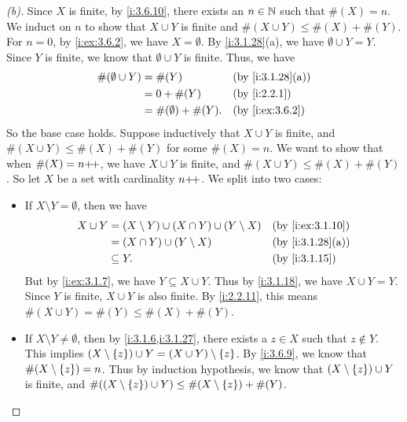\begin{proof}[(b)]
  Since \(X\) is finite, by \cref{i:3.6.10}, there exists an \(n \in \mathbb{N}\) such that \(\#(X) = n\).
  We induct on \(n\) to show that \(X \cup Y\) is finite and \(\#(X \cup Y) \leq \#(X) + \#(Y)\).
  For \(n = 0\), by \cref{i:ex:3.6.2}, we have \(X = \emptyset\).
  By \cref{i:3.1.28}(a), we have \(\emptyset \cup Y = Y\).
  Since \(Y\) is finite, we know that \(\emptyset \cup Y\) is finite.
  Thus, we have
  \begin{align*}
    \#(\emptyset \cup Y) & = \#(Y)                  &  & \by{i:3.1.28}[a] \\
                         & = 0 + \#(Y)              &  & \by{i:2.2.1}     \\
                         & = \#(\emptyset) + \#(Y). &  & \by{i:ex:3.6.2}
  \end{align*}
  So the base case holds.
  Suppose inductively that \(X \cup Y\) is finite, and \(\#(X \cup Y) \leq \#(X) + \#(Y)\) for some \(\#(X) = n\).
  We want to show that when \(\#(X) = n{+}\!{+}\), we have \(X \cup Y\) is finite, and \(\#(X \cup Y) \leq \#(X) + \#(Y)\).
  So let \(X\) be a set with cardinality \(n{+}\!{+}\).
  We split into two cases:
  \begin{itemize}
    \item If \(X \setminus Y = \emptyset\), then we have
          \begin{align*}
            X \cup Y & = (X \setminus Y) \cup (X \cap Y) \cup (Y \setminus X) &  & \by{i:ex:3.1.10} \\
                     & = (X \cap Y) \cup (Y \setminus X)                      &  & \by{i:3.1.28}[a] \\
                     & \subseteq Y.                                           &  & \by{i:3.1.15}
          \end{align*}
          But by \cref{i:ex:3.1.7}, we have \(Y \subseteq X \cup Y\).
          Thus by \cref{i:3.1.18}, we have \(X \cup Y = Y\).
          Since \(Y\) is finite, \(X \cup Y\) is also finite.
          By \cref{i:2.2.11}, this means \(\#(X \cup Y) = \#(Y) \leq \#(X) + \#(Y)\).
    \item If \(X \setminus Y \neq \emptyset\), then by \cref{i:3.1.6,i:3.1.27}, there exists a \(z \in X\) such that \(z \notin Y\).
          This implies \((X \setminus \left\lbrace z\right\rbrace) \cup Y = (X \cup Y) \setminus \left\lbrace z\right\rbrace\).
          By \cref{i:3.6.9}, we know that \(\#(X \setminus \left\lbrace z\right\rbrace) = n\).
          Thus by induction hypothesis, we know that \((X \setminus \left\lbrace z\right\rbrace) \cup Y\) is finite, and \(\#((X \setminus \left\lbrace z\right\rbrace) \cup Y) \leq \#(X \setminus \left\lbrace z\right\rbrace) + \#(Y)\).

\end{itemize}
\end{proof}
